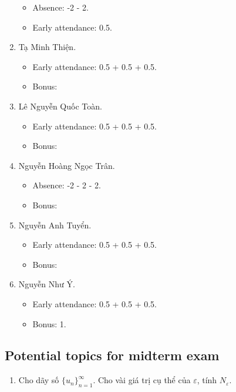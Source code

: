 \documentclass{article}
\begin{document}
\begin{enumerate}
	\begin{itemize}
		\item Absence: -2 - 2.
		\item Early attendance: 0.5.
	\end{itemize}
	\item {\sc Tạ Minh Thiện.}
	\begin{itemize}
		\item Early attendance: 0.5 + 0.5 + 0.5.
		\item Bonus: 
	\end{itemize}
	\item {\sc Lê Nguyễn Quốc Toàn.}
	\begin{itemize}
		\item Early attendance: 0.5 + 0.5 + 0.5.
		\item Bonus: 
	\end{itemize}
	\item {\sc Nguyễn Hoàng Ngọc Trân.}
	\begin{itemize}
		\item Absence: -2 - 2 - 2.
		\item Bonus: 
	\end{itemize}
	\item {\sc Nguyễn Anh Tuyển.}
	\begin{itemize}
		\item Early attendance: 0.5 + 0.5 + 0.5.
		\item Bonus: 
	\end{itemize}
	\item {\sc Nguyễn Như Ý.}
	\begin{itemize}
		\item Early attendance: 0.5 + 0.5 + 0.5.
		\item Bonus: 1.
	\end{itemize}
\end{enumerate}


\subsection{Potential topics for midterm exam}

\begin{enumerate}
	\item Cho dãy số $\{u_n\}_{n=1}^\infty$. Cho vài giá trị cụ thể của $\varepsilon$, tính $N_\varepsilon$.
\end{enumerate}
\end{document}
